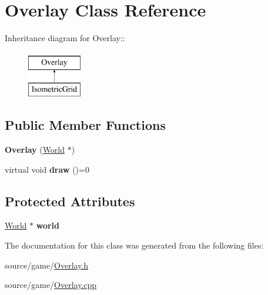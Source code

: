 \hypertarget{classOverlay}{
\section{Overlay Class Reference}
\label{classOverlay}
}
Inheritance diagram for Overlay::\begin{figure}[H]
\begin{center}
\leavevmode
\includegraphics[height=2cm]{classOverlay}
\end{center}
\end{figure}
\subsection*{Public Member Functions}
\begin{DoxyCompactItemize}
\item 
\hypertarget{classOverlay_aecb2ad2cea6041a1b1e332e041daeb13}{
{\bfseries Overlay} (\hyperlink{classWorld}{World} $\ast$)}
\label{classOverlay_aecb2ad2cea6041a1b1e332e041daeb13}

\item 
\hypertarget{classOverlay_a384639128697df8c44c3801ae9212be3}{
virtual void {\bfseries draw} ()=0}
\label{classOverlay_a384639128697df8c44c3801ae9212be3}

\end{DoxyCompactItemize}
\subsection*{Protected Attributes}
\begin{DoxyCompactItemize}
\item 
\hypertarget{classOverlay_aa0de2439856791f770c9e2e9bdc5b613}{
\hyperlink{classWorld}{World} $\ast$ {\bfseries world}}
\label{classOverlay_aa0de2439856791f770c9e2e9bdc5b613}

\end{DoxyCompactItemize}


The documentation for this class was generated from the following files:\begin{DoxyCompactItemize}
\item 
source/game/\hyperlink{Overlay_8h}{Overlay.h}\item 
source/game/\hyperlink{Overlay_8cpp}{Overlay.cpp}\end{DoxyCompactItemize}
